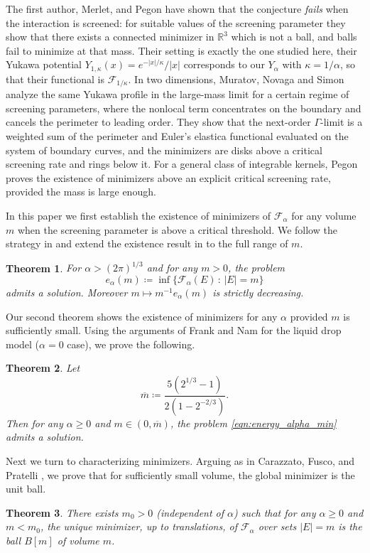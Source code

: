 \documentclass[a4paper,11pt,reqno]{amsart}
\numberwithin{equation}{section}
\newtheorem{theorem}{Theorem}[section]
\theoremstyle{remark}
\theoremstyle{definition}
\renewcommand{\bar}[1]{\overline{#1}}
\newcommand{\R}{\mathbb R}
\newcommand{\defeq}{\coloneqq}
\newcommand{\enf}{\mathcal{F}_{\alpha}}
\renewcommand{\geq}{\geqslant}
\newcommand{\calF}{\mathcal{F}}
\begin{document}
The first author, Merlet, and Pegon \cite{BMP} have shown that the conjecture \emph{fails} when the interaction is screened: for suitable values of the screening parameter they show that there exists a connected minimizer in $\R^3$ which is not a ball, and balls fail to minimize at that mass. Their setting is exactly the one studied here, their Yukawa potential $Y_{1,\kappa}(x)=e^{-|x|/\kappa}/|x|$ corresponds to our $Y_\alpha$ with $\kappa=1/\alpha$, so that their functional is $\calF_{1/\kappa}$. In two dimensions, Muratov, Novaga and Simon \cite{MNS} analyze the same Yukawa profile in the large-mass limit for a certain regime of screening parameters, where the nonlocal term concentrates on the boundary and cancels the perimeter to leading order. They show that the next-order $\Gamma$-limit is a weighted sum of the perimeter and Euler's elastica functional evaluated on the system of boundary curves, and the minimizers are disks above a critical screening rate and rings below it. For a general class of integrable kernels, Pegon \cite{Peg} proves the existence of minimizers above an explicit critical screening rate, provided the mass is large enough.

In this paper we first establish the existence of minimizers of $\enf$ for any volume $m$ when the screening parameter is above a critical threshold. We follow the strategy in \cite{MNS} and extend the existence result in \cite{Peg} to the full range of $m$.
	\begin{theorem}\label{thm:exist_every_m}
		For $\alpha>(2\pi)^{1/3}$ and for any $m>0$, the problem 	
		\begin{equation}\label{eqn:energy_alpha_min}
		e_{\alpha}(m) \defeq \inf \Big\{ \enf(E) \, : \, |E|=m \Big\}
	\end{equation}
 admits a solution. Moreover $m \mapsto m^{-1}e_\alpha(m)$ is strictly decreasing.
	\end{theorem}
	
Our second theorem shows the existence of minimizers for any $\alpha$ provided $m$ is sufficiently small. Using the arguments of Frank and Nam \cite{FN} for the liquid drop model ($\alpha=0$ case), we prove the following.
	\begin{theorem}\label{thm:exist_every_alpha}
		Let
			\[
				\bar{m} \defeq \frac{5(2^{1/3}-1)}{2(1-2^{-2/3})}.
			\] 
		Then for any $\alpha\geq 0$ and $m\in(0,\bar{m})$, the problem \eqref{eqn:energy_alpha_min} admits a solution.
	\end{theorem}

Next we turn to characterizing minimizers. Arguing as in Carazzato, Fusco, and Pratelli \cite{CFP}, we prove that for sufficiently small volume, the global minimizer is the unit ball.
	\begin{theorem}\label{thm:global_min}
		There exists $m_0>0$ (independent of $\alpha$) such that for any $\alpha\geq 0$ and $m<m_0$, the unique minimizer, up to translations, of $\enf$ over sets $|E|=m$ is the ball $B[m]$ of volume $m$. 
	\end{theorem}
	
\end{document}
